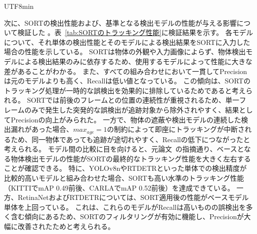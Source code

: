 \documentclass[conference, dvipdfmx]{IEEEtran}
\begin{document}
\begin{CJK}{UTF8}{min}
\begin{table}[htbp]
    \label{tab:SORTのトラッキング性能}
\end{table}
次に、SORTの検出性能および、基準となる検出モデルの性能が与える影響について検証した
。表~\ref{tab:SORTのトラッキング性能}に検証結果を示す。
各モデルについて、それ単体の検出性能とそのモデルによる検出結果をSORTに入力した場合の性能を示している。
SORTは物体の外観や入力画像によらず、物体検出モデルによる検出結果のみに依存するため、使用するモデルによって性能に大きな差があることがわかる。
また、すべての組み合わせにおいて一貫してPrecisionは元のモデルよりも高く、Recallは低い値となっている。
この傾向は、SORTのトラッキング処理が一時的な誤検出を効果的に排除しているためであると考えられる。
SORTでは前後のフレームとの位置の連続性が重視されるため、単一フレームのみで発生した突発的な誤検出が追跡対象から除外されやすく、結果としてPrecisionの向上がみられた。
一方で、物体の遮蔽や検出モデルの連続した検出漏れがあった場合、$max_{age}=1$の制約によって即座にトラッキングが中断されるため、同一物体であっても追跡が途切れやすく、Recallの低下につながったと考えられる。
モデル間の比較に目を向けると、元論文~\cite{SORT}の指摘通り、ベースとなる物体検出モデルの性能がSORTの最終的なトラッキング性能を大きく左右することが確認できる。
特に、YOLOv8nやRTDETRといった単体での検出精度が比較的高いモデルと組み合わせた場合、SORTも高い水準のトラッキング性能（KITTIでmAP 0.49前後、CARLAでmAP 0.52前後）を達成できている。
一方、RetinaNetおよびRTDETRについては、SORT適用後の性能がベースモデル単体を上回っている。
これは、これらのモデルがRecallは高いものの誤検出を多く含む傾向にあるため、SORTのフィルタリングが有効に機能し、Precisionが大幅に改善されたためと考えられる。


\end{CJK}
\end{document}
